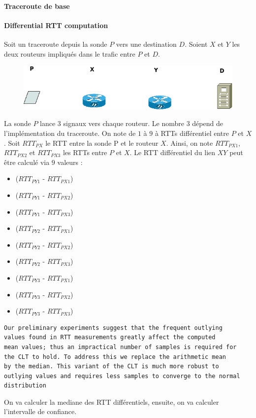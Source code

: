 \documentclass[]{report}
\begin{document}
\paragraph{Traceroute de base}

\paragraph{Differential RTT computation}
Soit un traceroute depuis la sonde $P$ vers une destination $D$. Soient $X$ et $Y$ les deux routeurs impliqués dans le trafic entre $P$ et $D$.

\begin{figure}[H]
\centering
\includegraphics[width=0.7\linewidth]{dia/traceroute}
\caption{}
\label{fig:traceroute}
\end{figure}

La sonde $P$ lance $3$ signaux vers chaque routeur. Le nombre $3$ dépend de l'implémentation du traceroute.  
On note de $1$ à $9$ à RTTs différentiel entre $P$ et $X$. Soit $RTT_{PX}$ le RTT entre la sonde P et le routeur $X$. Ainsi, on note $RTT_{PX1}$, $RTT_{PX2}$ et $RTT_{PX3}$ les RTTs entre $P$ et $X$. Le RTT différentiel du lien $XY$ peut être calculé via $9$ valeurs : 
\begin{itemize}
	\item ($RTT_{PY1}$ - $RTT_{PX1}$)
	\item ($RTT_{PY1}$ - $RTT_{PX2}$)
	\item ($RTT_{PY1}$ - $RTT_{PX3}$)
	\item ($RTT_{PY2}$ - $RTT_{PX1}$)
	\item ($RTT_{PY2}$ - $RTT_{PX2}$)
	\item ($RTT_{PY2}$ - $RTT_{PX3}$)	
	\item ($RTT_{PY3}$ - $RTT_{PX1}$)
	\item ($RTT_{PY3}$ - $RTT_{PX2}$)
	\item ($RTT_{PY3}$ - $RTT_{PX3}$)
\end{itemize}

\begin{verbatim}
Our preliminary experiments suggest that the frequent outlying
values found in RTT measurements greatly affect the computed
mean values; thus an impractical number of samples is required for
the CLT to hold. To address this we replace the arithmetic mean
by the median. This variant of the CLT is much more robust to
outlying values and requires less samples to converge to the normal
distribution 
\end{verbatim}
On va calculer la mediane des RTT différentiels, ensuite, on va calculer l'intervalle de confiance.
\end{document}
